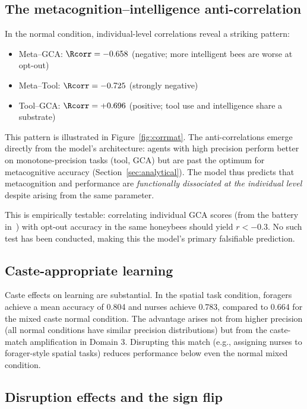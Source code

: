 \subsection*{The metacognition--intelligence anti-correlation}
\label{sec:sim:anticorr}

In the normal condition, individual-level correlations reveal a striking pattern:
\begin{itemize}
  \item Meta--GCA: $\Rcorr = -0.658$ (negative; more intelligent bees are worse at opt-out)
  \item Meta--Tool: $\Rcorr = -0.725$ (strongly negative)
  \item Tool--GCA: $\Rcorr = +0.696$ (positive; tool use and intelligence share a substrate)
\end{itemize}

This pattern is illustrated in Figure~\ref{fig:corrmat}. The anti-correlations emerge directly from
the model's architecture: agents with high precision perform better on monotone-precision tasks
(tool, GCA) but are past the optimum for metacognitive accuracy (Section~\ref{sec:analytical}).
The model thus predicts that metacognition and performance are \emph{functionally dissociated at the
individual level} despite arising from the same parameter.

This is empirically testable: correlating individual GCA scores (from the battery
in~\cite{AnimalCog2024}) with opt-out accuracy in the same honeybees should yield $r < -0.3$. No
such test has been conducted, making this the model's primary falsifiable prediction.

\subsection*{Caste-appropriate learning}
\label{sec:sim:caste}

Caste effects on learning are substantial. In the spatial task condition, foragers achieve a mean
accuracy of 0.804 and nurses achieve 0.783, compared to 0.664 for the mixed caste normal condition.
The advantage arises not from higher precision (all normal conditions have similar precision
distributions) but from the caste-match amplification in Domain 3. Disrupting this match
(e.g., assigning nurses to forager-style spatial tasks) reduces performance below even the
normal mixed condition.

\subsection*{Disruption effects and the sign flip}
\label{sec:sim:disruption}

